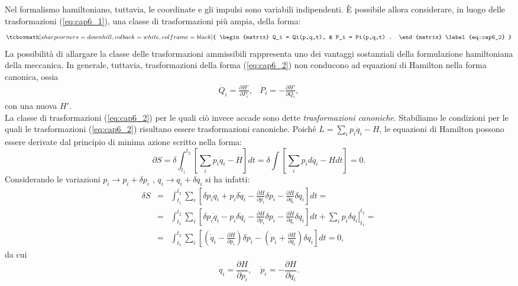 \documentclass[a4paper,12pt,oneside]{book}
\begin{document}
Nel formalismo hamiltoniano, tuttavia, le coordinate e gli impulsi sono variabili indipendenti. \`E possibile allora considerare, in luogo delle trasformazioni (\ref{eq:cap6_1}), una classe di trasformazioni pi\`u ampia, della forma:
	\begin{equation}
		\tcboxmath[sharp corners=downhill, colback=white, colframe=black]{
			\begin{matrix}
			Q_i = Qi(p,q,t),  & P_i = Pi(p,q,t) .
			\end{matrix}
			\label{eq:cap6_2}
			}
	\end{equation}
La possibilit\`a di allargare la classe delle trasformazioni ammissibili rappresenta uno dei vantaggi sostanziali della formulazione hamiltoniana della meccanica.
In generale, tuttavia, trasformazioni della forma (\ref{eq:cap6_2}) non conducono ad equazioni di Hamilton nella forma canonica, ossia
	\begin{equation}
		\begin{matrix}
		\displaystyle{\dot{Q}_i = \frac{\partial H'}{\partial P_i}}, & \displaystyle{\dot{P}_i = -\frac{\partial H'}{\partial Q_i}}  ,
		\end{matrix}
	\end{equation}
con una nuova $H'$.\\

La classe di trasformazioni (\ref{eq:cap6_2}) per le quali ci\`o invece accade sono dette \textit{trasformazioni canoniche}. Stabiliamo le condizioni per le quali le trasformazioni (\ref{eq:cap6_2}) risultano essere trasformazioni canoniche.
Poiché $ L = \sum _i p_i \dot{q}_i -H $, le equazioni di Hamilton possono essere derivate dal principio di minima azione scritto nella forma:
	\begin{equation}
		\partial S = \delta \int_{t_1}^{t_2} \left[ \sum_i p_i \dot{q}_i - H \right] dt = \delta \int \left[ \sum_i p_i dq_i - Hdt \right] = 0 .
		\label{eq:cap6_3}
	\end{equation}
Considerando le variazioni $p_i \rightarrow p_i + \delta p_i$ , $q_i \rightarrow q_i + \delta q_i$ si ha infatti:
	\begin{eqnarray}
		\delta S & =& \int _{t_1} ^{t_2} \sum _i \left[ \delta p_i \dot{q}_i + p_i \delta \dot{q}_i - \frac{\partial H}{\partial p_i} \delta p_i - \frac{\partial H}{\partial q_i}\delta q_i \right] dt = \nonumber \\
		&=&\int _{t_1} ^{t_2} \sum _i \left[ \delta p_i \dot{q}_i - p_i \delta \dot{q}_i - \frac{\partial H}{\partial p_i} \delta p_i - \frac{\partial H }{\partial q_i} \delta q_i \right] dt + \left.\sum_i  p_i \delta q_i \right\vert _{t_1} ^{t_2} = \nonumber \\
		&=& \int _{t_1} ^{t_2} \sum _i \left[ \left( \dot{q}_i - \frac{\partial H}{\partial p_i} \right) \delta p_i - \left( \dot{p}_i + \frac{\partial H}{\partial q_i}\right)\delta q_i \right] dt = 0 ,
	\end{eqnarray}
da cui
	\begin{equation}
		\dot{q}_i = \frac{\partial H}{\partial p_i} , \quad \dot{p}_i = - \frac{\partial H}{\partial q_i} .
	\end{equation}\\
	
\end{document}
